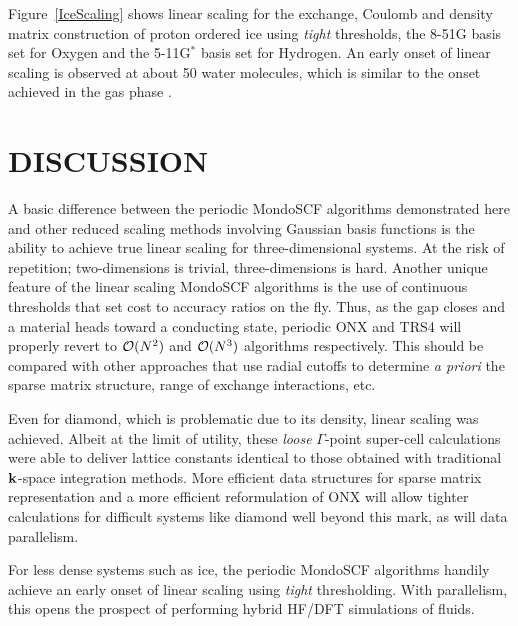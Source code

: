 \documentclass[prb,aps,nobibnotes,twocolumn,doublespace,twocolumngrid,superbib]{revtex4}
\begin{document}
Figure~\ref{IceScaling} shows linear scaling for the exchange, Coulomb and density matrix
construction of proton ordered ice \cite{} using {\it tight} thresholds, the 8-51G basis set
for Oxygen and the 5-11G$^*$ basis set for Hydrogen.  An early onset of linear scaling 
is observed at about 50 water molecules, which is similar to the onset achieved in the gas 
phase \cite{ANiklasson03}.


\section{DISCUSSION}

A basic difference between the periodic {\sc MondoSCF} algorithms demonstrated 
here and other reduced scaling methods involving Gaussian basis functions is the 
ability to achieve true linear scaling for three-dimensional systems.  At the risk
of repetition; two-dimensions is trivial, three-dimensions is hard.  Another unique
feature of the linear scaling {\sc MondoSCF} algorithms is the use of continuous
thresholds that set cost to accuracy ratios on the fly.  Thus, as the gap closes and
a material heads toward a conducting state, periodic {\sc ONX} and {\sc TRS4} will
properly revert to ${\cal O}(N^2)$ and ${\cal O}(N^3)$ algorithms respectively.  This
should be compared with other approaches that use radial cutoffs to determine {\em a priori} 
the sparse matrix structure, range of exchange interactions, etc. 

Even for diamond, which is problematic due to its density, linear scaling was achieved.  
Albeit at the limit of utility, these {\it loose} $\Gamma$-point super-cell calculations were 
able to deliver lattice constants identical to those obtained with traditional 
$\bf k$-space integration methods.  More efficient data structures for sparse 
matrix representation and a more efficient reformulation of {\sc ONX} will allow 
tighter calculations for difficult systems like diamond well beyond this mark, 
as will data parallelism.  

For less dense systems such as ice, the periodic {\sc MondoSCF} algorithms handily 
achieve an early onset of linear scaling using {\it tight} thresholding.  With parallelism,
this opens the prospect of performing hybrid HF/DFT simulations of fluids. 
\end{document}
